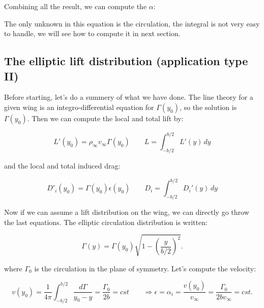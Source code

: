 	Combining all the result, we can compute the $\alpha$: 
	
	\begin{center}
	\end{center}
	
	The only unknown in this equation is the circulation, the integral is not very easy to handle, we will see how to compute it in next section. 
	

\subsection{The elliptic lift distribution (application type II)}
	Before starting, let's do a summery  of what we have done. The line theory for a given wing is an integro-differential equation for $\Gamma (y_0)$, so the solution is $\Gamma (y_0)$. Then we can compute the local and total lift by:
	
	\begin{equation}
	L'(y_0) = \rho _\infty v_\infty \Gamma (y_0) \qquad L = \int _{-b/2}^{b/2} L'(y)\, dy
	\end{equation}
	
	and the local and total induced drag: 
	
	\begin{equation}
	D'_i (y_0) = \Gamma (y_0) \epsilon (y_0) \qquad D_i = \int _{-b/2}^{b/2} D_i'(y)\, dy
	\end{equation}
	
	Now if we can assume a lift distribution on the wing, we can directly go throw the last equations. The elliptic circulation distribution is written:
	
	\begin{equation}
	\Gamma (y) = \Gamma (y_0) \sqrt{1-\left( \frac{y}{b/2} \right)^2}.
	\end{equation}
	
	where $\Gamma _0$ is the circulation in the plane of symmetry. Let's compute the velocity:
	
	\begin{equation}
	v(y_0) = \frac{1}{4\pi} \int _{-b/2}^{b/2} \frac{d\Gamma }{y_0 - y} = \frac{\Gamma _0}{2b} = cst \qquad \Rightarrow \epsilon = \alpha _i = \frac{v(y_0)}{v_\infty} = \frac{\Gamma _0}{2b v_\infty} = cst.
	\end{equation}
	
